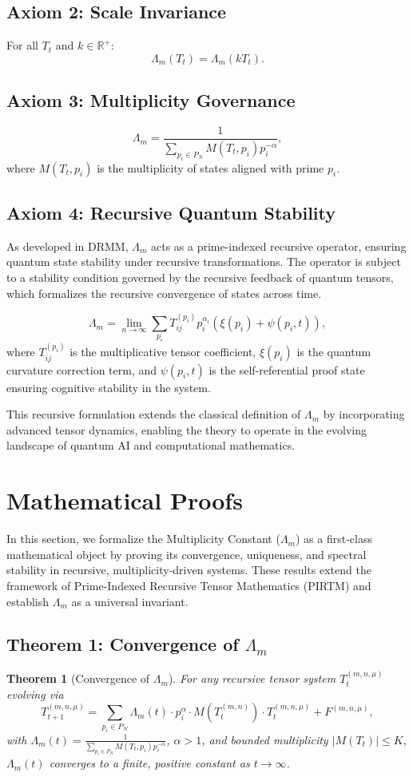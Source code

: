 \documentclass{article}
\theoremstyle{plain}
\newtheorem{theorem}{Theorem}
\begin{document}
\subsection{Axiom 2: Scale Invariance}
For all $T_t$ and $k \in \mathbb{R}^+$:
\[
\Lambda_m(T_t) = \Lambda_m(k T_t).
\]

\subsection{Axiom 3: Multiplicity Governance}
\[
\Lambda_m = \frac{1}{\sum_{p_i \in P_N} M(T_t, p_i) p_i^{-\alpha}},
\]
where $M(T_t, p_i)$ is the multiplicity of states aligned with prime $p_i$.

\subsection{Axiom 4: Recursive Quantum Stability}
As developed in DRMM, $\Lambda_m$ acts as a prime-indexed recursive operator, ensuring quantum state stability under recursive transformations. The operator is subject to a stability condition governed by the recursive feedback of quantum tensors, which formalizes the recursive convergence of states across time.

\[
\Lambda_m = \lim_{n \to \infty} \sum_{p_i} T_{ij}^{(p_i)} p_i^{\alpha_i} \left( \xi(p_i) + \psi(p_i, t) \right),
\]
where $T_{ij}^{(p_i)}$ is the multiplicative tensor coefficient, $\xi(p_i)$ is the quantum curvature correction term, and $\psi(p_i, t)$ is the self-referential proof state ensuring cognitive stability in the system.

This recursive formulation extends the classical definition of $\Lambda_m$ by incorporating advanced tensor dynamics, enabling the theory to operate in the evolving landscape of quantum AI and computational mathematics.




\section{Mathematical Proofs}
In this section, we formalize the Multiplicity Constant (\(\Lambda_m\)) as a first-class mathematical object by proving its convergence, uniqueness, and spectral stability in recursive, multiplicity-driven systems. These results extend the framework of Prime-Indexed Recursive Tensor Mathematics (PIRTM) and establish \(\Lambda_m\) as a universal invariant.

\subsection{Theorem 1: Convergence of \(\Lambda_m\)}
\begin{theorem}[Convergence of \(\Lambda_m\)]
For any recursive tensor system \( T_t^{(m, n, \mu)} \) evolving via
\[
T_{t+1}^{(m, n, \mu)} = \sum_{p_i \in P_N} \Lambda_m(t) \cdot p_i^\alpha \cdot M(T_t^{(m, n)}) \cdot T_t^{(m, n, \mu)} + F^{(m, n, \mu)},
\]
with \(\Lambda_m(t) = \frac{1}{\sum_{p_i \in P_N} M(T_t, p_i) p_i^{-\alpha}}\), \(\alpha > 1\), and bounded multiplicity \( |M(T_t)| \leq K \), \(\Lambda_m(t)\) converges to a finite, positive constant as \( t \to \infty \).
\end{theorem}
\end{document}

